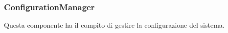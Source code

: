 \documentclass[10pt, a4paper]{article}
\begin{document}
\subsubsection{ConfigurationManager}
Questa componente ha il compito di gestire la configurazione del sistema.

\end{document}
